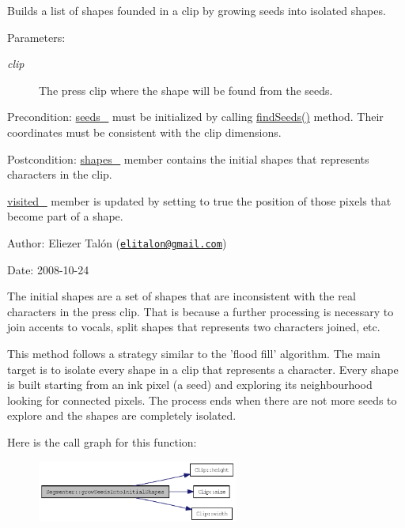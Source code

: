 Builds a list of shapes founded in a clip by growing seeds into isolated shapes. 

\begin{Desc}
\item[Parameters:]
\begin{description}
\item[{\em clip}]The press clip where the shape will be found from the seeds.\end{description}
\end{Desc}
\begin{Desc}
\item[Precondition:]\hyperlink{class_segmenter_7859d050250b9fdf7c96374f80008d6e}{seeds\_\-} must be initialized by calling \hyperlink{class_segmenter_bacab187b543a51c5322c01fc0a29ffb}{findSeeds()} method. Their coordinates must be consistent with the clip dimensions.\end{Desc}
\begin{Desc}
\item[Postcondition:]\hyperlink{class_segmenter_41b94ede2829063e0937dc150756e77e}{shapes\_\-} member contains the initial shapes that represents characters in the clip. 

\hyperlink{class_segmenter_fe4dd18749f268aae2b26a1abff6a607}{visited\_\-} member is updated by setting to true the position of those pixels that become part of a shape.\end{Desc}
\begin{Desc}
\item[Author:]Eliezer Talón (\href{mailto:elitalon@gmail.com}{\tt elitalon@gmail.com}) \end{Desc}
\begin{Desc}
\item[Date:]2008-10-24\end{Desc}
The initial shapes are a set of shapes that are inconsistent with the real characters in the press clip. That is because a further processing is necessary to join accents to vocals, split shapes that represents two characters joined, etc.

This method follows a strategy similar to the 'flood fill' algorithm. The main target is to isolate every shape in a clip that represents a character. Every shape is built starting from an ink pixel (a seed) and exploring its neighbourhood looking for connected pixels. The process ends when there are not more seeds to explore and the shapes are completely isolated. 

Here is the call graph for this function:\nopagebreak
\begin{figure}[H]
\begin{center}
\leavevmode
\includegraphics[width=187pt]{class_segmenter_72c007e345fad7abbf6e9d4edb615a50_cgraph}
\end{center}
\end{figure}


